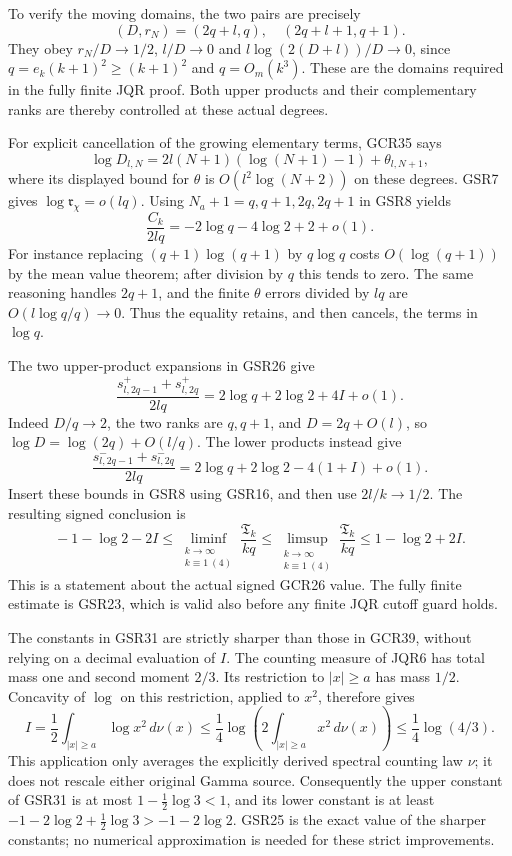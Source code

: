 \documentclass[11pt,a4paper]{article}
\begin{document}
To verify the moving domains, the two pairs are precisely
\[
 (D,r_N)=(2q+l,q),\quad(2q+l+1,q+1).
\tag{GSR27}
\]
They obey $r_N/D\to1/2$, $l/D\to0$ and
$l\log(2(D+l))/D\to0$, since
$q=e_k(k+1)^2\geq(k+1)^2$ and $q=O_m(k^3)$.
These are the domains required in the fully finite JQR
proof. Both upper products and their complementary ranks
are thereby controlled at these actual degrees.

For explicit cancellation of the growing elementary terms,
GCR35 says
\[
 \log D_{l,N}=2l(N+1)(\log(N+1)-1)+\theta_{l,N+1},
\]
where its displayed bound for $\theta$ is
$O(l^2\log(N+2))$ on these degrees. GSR7 gives
$\log\mathfrak r_\chi=o(lq)$.
Using $N_a+1=q,q+1,2q,2q+1$ in GSR8 yields
\[
 \frac{C_k}{2lq}
          =-2\log q-4\log2+2+o(1).
\tag{GSR28}
\]
For instance replacing $(q+1)\log(q+1)$ by $q\log q$
costs $O(\log(q+1))$ by the mean value theorem; after
division by $q$ this tends to zero. The same reasoning
handles $2q+1$, and the finite $\theta$ errors divided
by $lq$ are $O(l\log q/q)\to0$. Thus the equality
retains, and then cancels, the terms in $\log q$.

The two upper-product expansions in GSR26 give
\[
 \frac{s^+_{l,2q-1}+s^+_{l,2q}}{2lq}
             =2\log q+2\log2+4I+o(1).
\tag{GSR29}
\]
Indeed $D/q\to2$, the two ranks are $q,q+1$, and
$D=2q+O(l)$, so
$\log D=\log(2q)+O(l/q)$.
The lower products instead give
\[
 \frac{s^-_{l,2q-1}+s^-_{l,2q}}{2lq}
             =2\log q+2\log2-4(1+I)+o(1).
\tag{GSR30}
\]
Insert these bounds in GSR8 using GSR16, and then use
$2l/k\to1/2$. The resulting signed conclusion is
\[
 \boxed{\quad
 -1-\log2-2I
 \leq\liminf_{\substack{k\to\infty\\k\equiv1\ (4)}}
                    \frac{\mathfrak T_k}{kq}
 \leq\limsup_{\substack{k\to\infty\\k\equiv1\ (4)}}
                    \frac{\mathfrak T_k}{kq}
 \leq1-\log2+2I.
 \quad}\tag{GSR31}
\]
This is a statement about the actual signed GCR26 value.
The fully finite estimate is GSR23, which is valid also
before any finite JQR cutoff guard holds.

The constants in GSR31 are strictly sharper than those
in GCR39, without relying on a decimal evaluation of $I$.
The counting measure of JQR6 has total mass one and second
moment $2/3$. Its restriction to $|x|\geq a$ has mass $1/2$.
Concavity of $\log$ on this restriction, applied to $x^2$,
therefore gives
\[
 I=\frac12\int_{|x|\geq a}\log x^2\,d\nu(x)
 \leq\frac14\log\left(2\int_{|x|\geq a}x^2\,d\nu(x)\right)
 \leq\frac14\log(4/3).
\tag{GSR32}
\]
This application only averages the explicitly derived spectral
counting law $\nu$; it does not rescale either original Gamma source.
Consequently the upper constant of GSR31 is at most
$1-\tfrac12\log3<1$, and its lower constant is at least
$-1-2\log2+\tfrac12\log3>-1-2\log2$.
GSR25 is the exact value of the sharper constants; no
numerical approximation is needed for these strict improvements.
\end{document}
